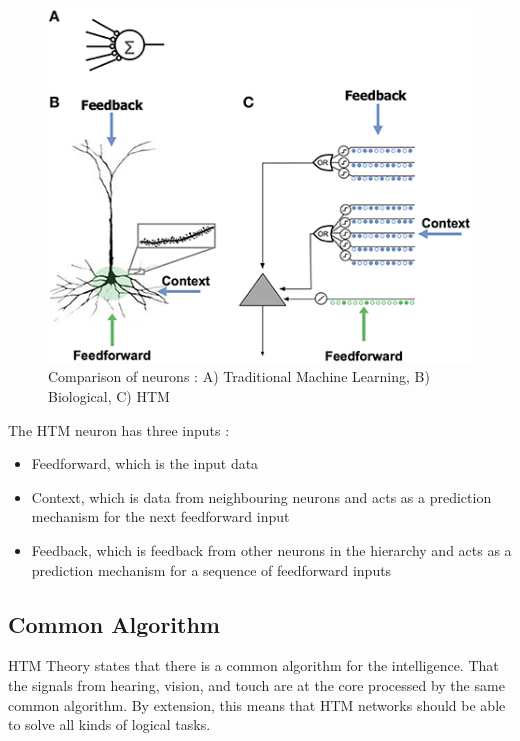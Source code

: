 \begin{figure}[H]
    \centering
    \includegraphics[width=\linewidth]{resources/related_works/neuron_comparison.jpg}
    \caption{Comparison of neurons \protect\cite{htm_neurons}: A) Traditional Machine Learning, B) Biological, C) HTM}
    \label{fig:neuron_comparison}
\end{figure}
The HTM neuron has three inputs \cite{htm_neurons}:
\begin{itemize}
    \item Feedforward, which is the input data
    \item Context, which is data from neighbouring neurons and acts as a prediction mechanism for the next feedforward input
    \item Feedback, which is feedback from other neurons in the hierarchy and acts as a prediction mechanism for a sequence of feedforward inputs
\end{itemize}
\subsection{Common Algorithm}
HTM Theory states that there is a common algorithm for the intelligence. That the signals from hearing, vision, and touch are at the core processed by the same common algorithm. By extension, this means that HTM networks should be able to solve all kinds of logical tasks.
